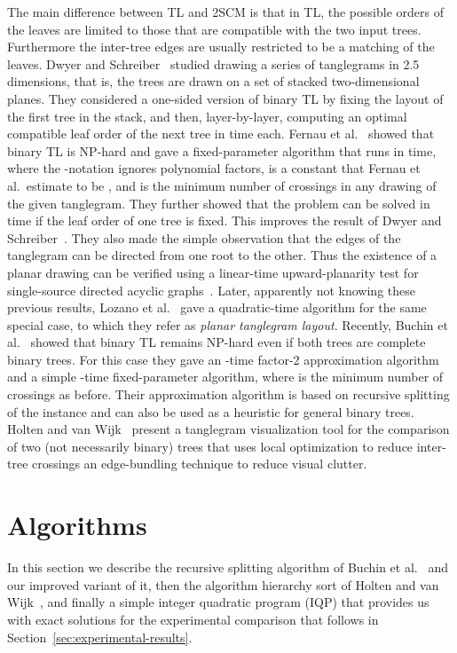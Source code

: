\documentclass[runningheads,a4paper]{llncs}
\begin{document}
The main difference between TL and 2SCM is that in TL, the possible orders
of the leaves are limited to those that are compatible with the two
input trees. Furthermore the inter-tree edges are usually restricted
to be a matching of the leaves.  Dwyer and
Schreiber~\cite{ds-oloth-04} studied drawing a series of tanglegrams
in 2.5 dimensions, that is, the trees are drawn on a set of stacked
two-dimensional planes. They considered a one-sided version of
binary TL by fixing the layout of the first tree in the stack, and
then, layer-by-layer, computing an optimal compatible leaf order of
the next tree in  time each.  
Fernau et al.~\cite{fkp-ctvcm-05} showed
that binary TL is NP-hard and gave a fixed-parameter algorithm that runs in
 time, where the -notation ignores polynomial
factors,  is a constant that Fernau et al.\ estimate to
be , and  is the minimum number of crossings in any drawing
of the given tanglegram.  They further showed that the problem can
be solved in  time if the leaf order of one tree is
fixed.  This improves the result of Dwyer and
Schreiber~\cite{ds-oloth-04}.  They also made the simple observation
that the edges of the tanglegram can be directed from one root to
the other.  Thus the existence of a planar drawing can be verified
using a linear-time upward-planarity test for single-source directed
acyclic graphs~\cite{bdmt-dupts-98}.  Later, apparently not knowing
these previous results, Lozano et al.~\cite{lprvz-stapt-07} gave a
quadratic-time algorithm for the same special case, to which they
refer as \emph{planar tanglegram layout}.  Recently, Buchin et
al.~\cite{bbbnow-dbtha-08} showed that binary TL remains NP-hard even if
both trees are complete binary trees. For this case they gave an
-time factor-2 approximation algorithm and a simple
-time fixed-parameter algorithm, where  is the
minimum number of crossings as before. Their approximation algorithm
is based on recursive splitting of the instance and can also be used
as a heuristic for general binary trees.  Holten and van
Wijk~\cite{hw-vchod-08} present a tanglegram visualization
tool for the comparison of two (not necessarily binary) trees that
uses local optimization to reduce inter-tree crossings
an edge-bundling technique to reduce visual clutter.


\section{Algorithms}\label{sec:algorithms}

In this section we describe the recursive splitting algorithm of
Buchin et al.~\cite{bbbnow-dbtha-08} and our improved variant of it,
then the algorithm hierarchy sort of Holten and van
Wijk~\cite{hw-vchod-08}, and finally a simple integer quadratic
program (IQP) that provides us with exact solutions for the
experimental comparison that follows in
Section~\ref{sec:experimental-results}.
\end{document}
